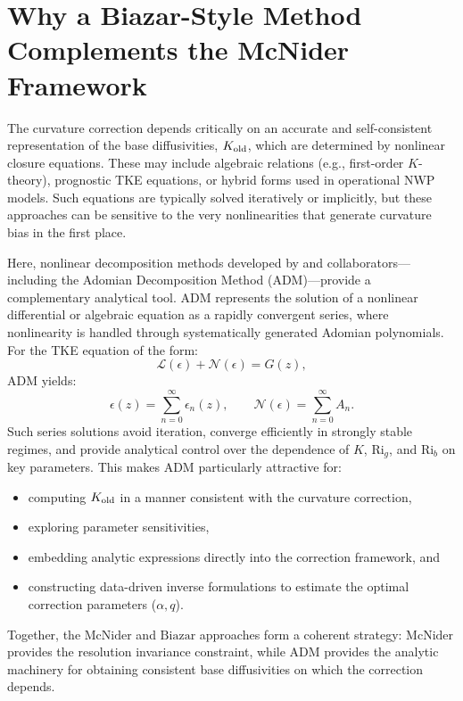 \documentclass[12pt, a4paper]{article}
\begin{document}
\section{Why a Biazar-Style Method Complements the McNider Framework}

The curvature correction depends critically on an accurate and self-consistent representation of the base diffusivities, $K_{\rm old}$, which are determined by nonlinear closure equations. These may include algebraic relations (e.g., first-order $K$-theory), prognostic TKE equations, or hybrid forms used in operational NWP models. Such equations are typically solved iteratively or implicitly, but these approaches can be sensitive to the very nonlinearities that generate curvature bias in the first place.

Here, nonlinear decomposition methods developed by \cite{biazar} and collaborators—including the Adomian Decomposition Method (ADM)—provide a complementary analytical tool. $\text{ADM}$ represents the solution of a nonlinear differential or algebraic equation as a rapidly convergent series, where nonlinearity is handled through systematically generated Adomian polynomials. For the TKE equation of the form:
$$ \mathcal{L}(\epsilon) + \mathcal{N}(\epsilon) = G(z), $$
$\text{ADM}$ yields:
$$ \epsilon(z)=\sum_{n=0}^\infty \epsilon_n(z),\qquad
\mathcal{N}(\epsilon)=\sum_{n=0}^\infty A_n. $$
Such series solutions avoid iteration, converge efficiently in strongly stable regimes, and provide analytical control over the dependence of $K$, $\text{Ri}_g$, and $\text{Ri}_b$ on key parameters. This makes $\text{ADM}$ particularly attractive for:
\begin{itemize}
    \item computing $K_{\rm old}$ in a manner consistent with the curvature correction,
    \item exploring parameter sensitivities,
    \item embedding analytic expressions directly into the correction framework, and
    \item constructing data-driven inverse formulations to estimate the optimal correction parameters ($\alpha,q$).
\end{itemize}
Together, the $\text{McNider}$ and $\text{Biazar}$ approaches form a coherent strategy: $\text{McNider}$ provides the resolution invariance constraint, while $\text{ADM}$ provides the analytic machinery for obtaining consistent base diffusivities on which the correction depends.

\end{document}
